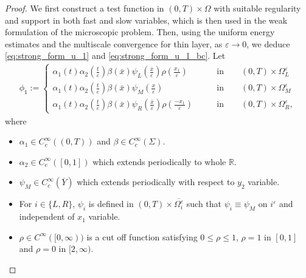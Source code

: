 \documentclass[11pt]{article}
\def\es{\varepsilon}
\def\orr{\Omega_R^\varepsilon}
\def\omm{\Omega_M^\varepsilon}
\def\oll{\Omega_L^\varepsilon}
\def\oii{\Omega_i^\varepsilon}
\begin{document}
\begin{proof}
    We first construct a test function in $(0,T)\times\Omega$ with suitable regularity and support in both fast and slow variables, which is then used in the weak formulation of the microscopic problem. Then, using the uniform energy estimates and the multiscale convergence for thin layer, as $\es\rightarrow0$, we deduce \eqref{eq:strong_form_u_1} and \eqref{eq:strong_form_u_1_bc}.
Let
\begin{align*}
    \phi_1:=\begin{cases} 
      \alpha_1(t)\alpha_2(\frac{t}{\es})\beta(\bar x) \psi_L(\frac{\bar x}{\es})\rho(\frac{x_1}{\es}) &  \qquad \mbox{in}\qquad (0,T)\times \oll\\
      \alpha_1(t)\alpha_2(\frac{t}{\es})\beta(\bar x) \psi_M(\frac{x}{\es}) & \qquad \mbox{in}\qquad (0,T)\times \omm\\
      \alpha_1(t)\alpha_2(\frac{t}{\es})\beta(\bar x) \psi_R(\frac{\bar x}{\es})\rho(\frac{-x_1}{\es}) & \qquad \mbox{in}\qquad (0,T)\times \orr,
   \end{cases}
\end{align*}
where
\begin{itemize}
    \item $\alpha_1\in C_c^\infty((0,T))$ and $\beta\in C_c^\infty(\Sigma).$
    \item $ \alpha_2\in C_{c}^\infty([0,1])$ which extends periodically to whole $\mathbb{R}.$
    \item $\psi_M\in C_c^\infty(\overline Y) $ which extends periodically with respect to $y_2$ variable.
    \item For $i\in \{L,R\}$, $ \psi_i $ is defined in $(0,T)\times \overline{\oii}$ such that $\psi_i\equiv\psi_M$ on $i^\es$ and independent of $x_1$ variable.
    \item $\rho\in C^\infty([0,\infty))$ is a cut off function satisfying  $0\leq\rho \leq1$, $\rho=1$ in $[0,1]$ and $\rho=0 $ in $[2,\infty).$
\end{itemize}








\end{proof}
\end{document}

